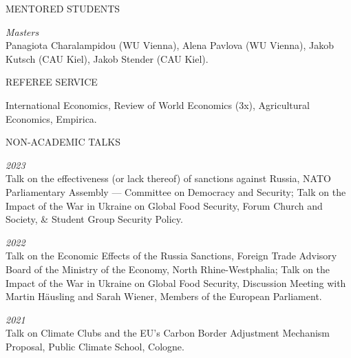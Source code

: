 \documentclass{article}
\begin{document}

\begin{minipage}[t]{0.12\textwidth}
    {\selectfont MENTORED STUDENTS} \\
\end{minipage}
\hspace{5mm}
\begin{minipage}[t]{0.8\textwidth}
    \textit{Masters} \\
    Panagiota Charalampidou (WU Vienna), Alena Pavlova (WU Vienna), Jakob Kutsch (CAU Kiel), Jakob Stender (CAU Kiel).
\end{minipage}
\medskip


\begin{minipage}[t]{0.12\textwidth}
    {\selectfont REFEREE SERVICE} \\
\end{minipage}
\hspace{5mm}
\begin{minipage}[t]{0.8\textwidth}
    International Economics, Review of World Economics (3x), Agricultural Economics, Empirica.
\end{minipage}
\medskip


\begin{minipage}[t]{0.12\textwidth}
    {\selectfont NON-ACADEMIC TALKS} \\
\end{minipage}
\hspace{5mm}
\begin{minipage}[t]{0.8\textwidth}
    \textit{2023} \\
    Talk on the effectiveness (or lack thereof) of sanctions against Russia, NATO Parliamentary Assembly --- Committee on Democracy and Security; Talk on the Impact of the War in Ukraine on Global Food Security, Forum Church and Society, \& Student Group Security Policy. \par 
    \textit{2022} \\
    Talk on the Economic Effects of the Russia Sanctions, Foreign Trade Advisory Board of the Ministry of the Economy, North Rhine-Westphalia; Talk on the Impact of the War in Ukraine on Global Food Security, Discussion Meeting with Martin Häusling and Sarah Wiener, Members of the European Parliament. \par
    \textit{2021} \\
    Talk on Climate Clubs and the EU's Carbon Border Adjustment Mechanism Proposal, Public Climate School, Cologne. \par
\end{minipage}
\medskip
\end{document}
